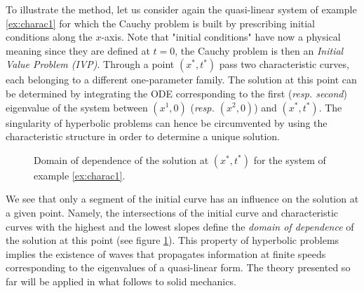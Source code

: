 To illustrate the method, let us consider again the quasi-linear system of example \ref{ex:charac1} for which the Cauchy problem is built by prescribing initial conditions along the $x$-axis. Note that "initial conditions" have now a physical meaning since they are defined at $t=0$, the Cauchy problem is then an \textit{Initial Value Problem (IVP)}. Through a point $(x^*,t^*)$ pass two characteristic curves, each belonging to a different one-parameter family. The solution at this point can be determined by integrating the ODE corresponding to the first (\textit{resp. second}) eigenvalue of the system between $(x^1,0)$ (\textit{resp. $(x^2,0)$}) and $(x^*,t^*)$. The singularity of hyperbolic problems can hence be circumvented by using the characteristic structure in order to determine a unique solution. 
\begin{figure}[h]
  \centering
  
  \caption{Domain of dependence of the solution at $(x^*,t^*)$ for the system of example \ref{ex:charac1}.}
  \label{fig:charac_method2x2}
\end{figure}
We see that only a segment of the initial curve has an influence on the solution at a given point. Namely, the intersections of the initial curve and characteristic curves with the highest and the lowest slopes define the \textit{domain of dependence} of the solution at this point (see figure \ref{fig:charac_method2x2}). This property of hyperbolic problems implies the existence of waves that propagates information at finite speeds corresponding to the eigenvalues of a quasi-linear form. The theory presented so far will be applied in what follows to solid mechanics.



